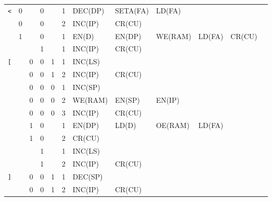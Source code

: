 \begin{longtable}[c] {c|cccc|c|llllll}
    \rowcolor{White} \texttt{<}   & 0 &   & 0     &      & 1     & DEC(DP)  & SETA(FA) & LD(FA)  &        &        &        \\
    \rowcolor{White}              & 0 &   & 0     &      & 2     & INC(IP)  & CR(CU)   &         &        &        &        \\
    \rowcolor{Gray}               & 1 &   & 0     &      & 1     & EN(D)    & EN(DP)   & WE(RAM) & LD(FA) & CR(CU) &        \\
    \rowcolor{White}              &   &   & 1     &      & 1     & INC(IP)  & CR(CU)   &         &        &        &        \\ \hline
    
    \rowcolor{Gray}  \texttt{[}   &   & 0 & 0     & 1    & 1     & INC(LS)  &          &         &        &        &        \\
    \rowcolor{Gray}               &   & 0 & 0     & 1    & 2     & INC(IP)  & CR(CU)   &         &        &        &        \\      
    \rowcolor{White}              &   & 0 & 0     & 0    & 1     & INC(SP)  &          &         &        &        &        \\
    \rowcolor{White}              &   & 0 & 0     & 0    & 2     & WE(RAM)  & EN(SP)   & EN(IP)  &        &        &        \\
    \rowcolor{White}              &   & 0 & 0     & 0    & 3     & INC(IP)  & CR(CU)   &         &        &        &        \\
    \rowcolor{Gray}               &   & 1 & 0     &      & 1     & EN(DP)   & LD(D)    & OE(RAM) & LD(FA) &        &        \\
    \rowcolor{Gray}               &   & 1 & 0     &      & 2     & CR(CU)   &          &         &        &        &        \\
    \rowcolor{White}              &   &   & 1     &      & 1     & INC(LS)  &          &         &        &        &        \\
    \rowcolor{White}              &   &   & 1     &      & 2     & INC(IP)  & CR(CU)   &         &        &        &        \\ \hline
    
    \rowcolor{White} \texttt{]}   &   & 0 & 0     & 1    & 1     & DEC(SP)  &          &         &        &        &        \\
    \rowcolor{White}              &   & 0 & 0     & 1    & 2     & INC(IP)  & CR(CU)   &         &        &        &        \\
        

\end{longtable}

